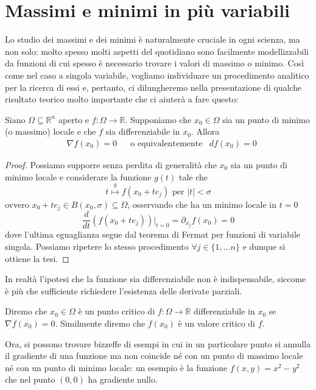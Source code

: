 \documentclass[openany, italian]{book}
\begin{document}
\section{Massimi e minimi in più variabili}
Lo studio dei massimi e dei minimi è naturalmente cruciale in ogni scienza, ma non solo: molto spesso molti aspetti del quotidiano sono facilmente modellizzabili da funzioni di cui spesso è necessario trovare i valori di massimo o minimo. Così come nel caso a singola variabile, vogliamo individuare un procedimento analitico per la ricerca di essi e, pertanto, ci dilungheremo nella presentazione di qualche risultato teorico molto importante che ci aiuterà a fare questo:
\begin{theorem}
Siano $\Omega \subseteq \mathbb{R}^n$ aperto e $f: \Omega \to \mathbb{R}$. Supponiamo che $x_0 \in \Omega$ sia un punto di minimo (o massimo) locale e che $f$ sia differenziabile in $x_0$. Allora
\begin{align*}
&\nabla{f(x_0)} = 0 & &\text{o equivalentemente} &df(x_0) = 0 
\end{align*}
\end{theorem}
\begin{proof}
Possiamo supporre senza perdita di generalità che $x_0$ sia un punto di minimo locale e considerare la funzione $g(t)$ tale che
$$
t \stackrel{g}{\mapsto} f(x_0 + te_j) \text{ per } |t| < \sigma
$$
ovvero $x_0 + te_j \in B(x_0, \sigma) \subseteq \Omega$, osservando che ha un minimo locale in $t=0$
$$
\frac{d}{dt} \left( f(x_0 + te_j) \right){\big|_{t=0}} = \partial_{x_j} f(x_0) = 0
$$
dove l'ultima eguaglianza segue dal teorema di Fermat per funzioni di variabile singola. Possiamo ripetere lo stesso procedimento $\forall j \in \{1, \ldots n \}$ e dunque si ottiene la tesi.
\end{proof}
\begin{remark}
In realtà l'ipotesi che la funzione sia differenziabile non è indispensabile, siccome è più che sufficiente richiedere l'esistenza delle derivate parziali.
\end{remark}
\begin{definition}
Diremo che $x_0 \in \Omega$ è un punto critico di $f: \Omega \to \mathbb{R}$ differenziabile in $x_0$ se $\nabla{f(x_0)} = 0$. Similmente diremo che $f(x_0)$ è un valore critico di $f$.
\end{definition}
Ora, si possono trovare bizzeffe di esempi in cui in un particolare punto si annulla il gradiente di una funzione ma non coincide né con un punto di massimo locale né con un punto di minimo locale: un esempio è la funzione $f(x, y) = x^2 - y^2$ che nel punto $(0, 0)$ ha gradiente nullo. \\
\end{document}
